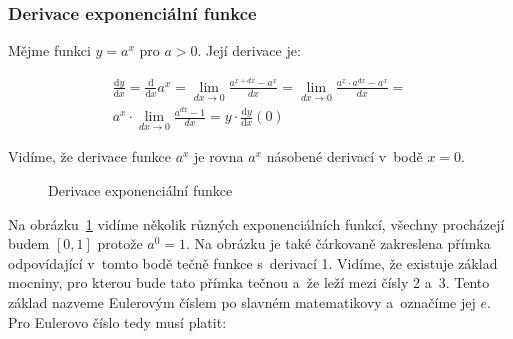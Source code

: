 \subsubsection{Derivace exponenciální funkce}

Mějme funkci \(y = a^x\) pro \(a > 0\). Její derivace je:

\begin{equation}
\begin{split}
\frac{\mathrm{d}y}{\mathrm{d}x} = \frac{\mathrm{d}}{\mathrm{d}x} a^x = \lim_{dx \to 0} \frac{a^{x+dx} - a^x}{dx} = \lim_{dx \to 0} \frac{a^x \cdot a^{dx} - a^x}{dx} = \\
a^x \cdot \lim_{dx \to 0} \frac{a^{dx} - 1}{dx} = y \cdot \frac{\mathrm{d}y}{\mathrm{d}x}(0)
\end{split}
\end{equation}

Vidíme, že derivace funkce \(a^x\) je rovna \(a^x\) násobené derivací v~bodě \(x = 0\).

\begin{figure}
\begin{center}
\caption{Derivace exponenciální funkce}
\end{center}
\label{img:derivace_exponencialni_funkce}
\end{figure}

Na obrázku~\ref{img:derivace_exponencialni_funkce} vidíme několik různých exponenciálních funkcí, všechny procházejí budem \([0, 1]\) protože \(a^0 = 1\). Na obrázku je také čárkovaně zakreslena přímka odpovídající v~tomto bodě tečně funkce s~derivací 1. Vidíme, že existuje základ mocniny, pro kterou bude tato přímka tečnou a~že leží mezi čísly 2 a~3. Tento základ nazveme Eulerovým číslem po slavném matematikovy a~označíme jej \(e\). Pro Eulerovo číslo tedy musí platit:

